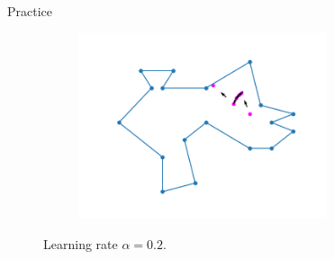 \documentclass{beamer}
\begin{document}
\begin{frame}{Practice}
\begin{figure}[h!]
\begin{subfigure}{0.4\textwidth}
			\caption{}
			\label{fig:comb_gradient}
		\end{subfigure}
		\begin{subfigure}{0.4\textwidth}
			\centering
			\includegraphics[width = 0.8\textwidth]{Images/random_gradient.png}
			\caption{}
			\label{fig:random_gradient}
		\end{subfigure}
		\caption{Learning rate $\alpha = 0.2$.}
		\label{fig:gradients}
	\end{figure}
\end{frame}

\end{document}
